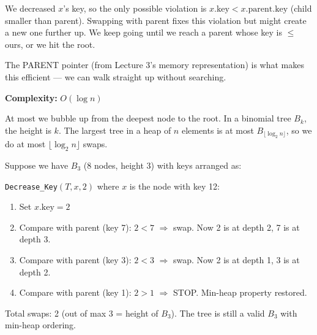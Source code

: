 \documentclass[11pt]{article}
\begin{document}
\begin{keybox}
We decreased $x$'s key, so the only possible violation is $x.\text{key} < x.\text{parent}.\text{key}$ (child smaller than parent). Swapping with parent fixes this violation but might create a new one further up. We keep going until we reach a parent whose key is $\leq$ ours, or we hit the root.

The \textcolor{rustW}{PARENT pointer} (from Lecture 3's memory representation) is what makes this efficient — we can walk straight up without searching.
\end{keybox}

\textbf{Complexity:} \textcolor{greenO}{$O(\log n)$}

At most we bubble up from the deepest node to the root. In a binomial tree $B_k$, the height is $k$. The largest tree in a heap of $n$ elements is at most $B_{\lfloor \log_2 n \rfloor}$, so we do at most $\lfloor \log_2 n \rfloor$ swaps.

\begin{examplebox}
Suppose we have $B_3$ (8 nodes, height 3) with keys arranged as:

\begin{center}
\end{center}

\texttt{Decrease\_Key$(T, x, 2)$} where $x$ is the node with key 12:

\begin{enumerate}[leftmargin=1.4em,itemsep=2pt]
    \item Set $x.\text{key} = 2$
    \item Compare with parent (key 7): $2 < 7$ $\Rightarrow$ swap. Now 2 is at depth 2, 7 is at depth 3.
    \item Compare with parent (key 3): $2 < 3$ $\Rightarrow$ swap. Now 2 is at depth 1, 3 is at depth 2.
    \item Compare with parent (key 1): $2 > 1$ $\Rightarrow$ \textcolor{greenO}{STOP}. Min-heap property restored.
\end{enumerate}

Total swaps: 2 (out of max 3 = height of $B_3$). The tree is still a valid $B_3$ with min-heap ordering.
\end{examplebox}
\end{document}

